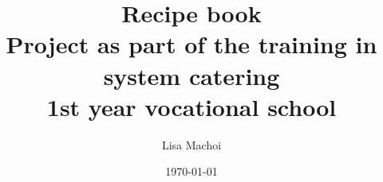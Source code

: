 \documentclass[10pt,a4paper]{article}
\begin{document}
\thispagestyle{empty}
\title{Recipe book\\
	\vspace{1cm}
	{\large Project as part of the training in system catering}\\
	{\small 1st year vocational school}
	\vspace{2cm}
}
\author{Lisa Machoi}
\date{\today}
\maketitle
\newpage
\thispagestyle{empty}
\tableofcontents
\setcounter{page}{0}
%
\newpage
\setcounter{page}{1}


























\end{document}
